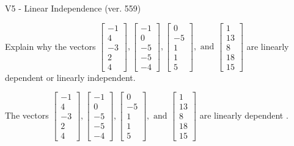 \begin{exercise}
  \begin{exerciseTitle}V5 - Linear Independence (ver. 559)\end{exerciseTitle}
  \begin{exerciseStatement}
    Explain why the vectors \(\left[\begin{array}{r}
-1 \\
4 \\
-3 \\
2 \\
4
\end{array}\right] , \left[\begin{array}{r}
-1 \\
0 \\
-5 \\
-5 \\
-4
\end{array}\right] , \left[\begin{array}{r}
0 \\
-5 \\
1 \\
1 \\
5
\end{array}\right] , \text{ and } \left[\begin{array}{r}
1 \\
13 \\
8 \\
18 \\
15
\end{array}\right]\) are linearly dependent or linearly independent.	


  \end{exerciseStatement}
  \begin{exerciseAnswer}
   The vectors \(\left[\begin{array}{r}
-1 \\
4 \\
-3 \\
2 \\
4
\end{array}\right] , \left[\begin{array}{r}
-1 \\
0 \\
-5 \\
-5 \\
-4
\end{array}\right] , \left[\begin{array}{r}
0 \\
-5 \\
1 \\
1 \\
5
\end{array}\right] , \text{ and } \left[\begin{array}{r}
1 \\
13 \\
8 \\
18 \\
15
\end{array}\right]\) are 
  	 linearly dependent  .
  


  \end{exerciseAnswer}
\end{exercise}